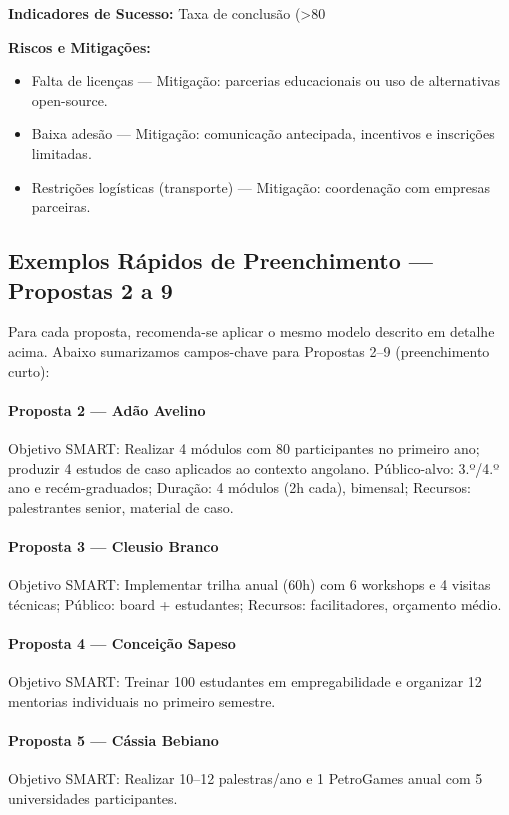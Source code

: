 \documentclass[12pt,a4paper]{article}
\begin{document}
\textbf{Indicadores de Sucesso:} Taxa de conclusão (>80%

\textbf{Riscos e Mitigações:}
\begin{itemize}
    \item Falta de licenças — Mitigação: parcerias educacionais ou uso de alternativas open-source.
    \item Baixa adesão — Mitigação: comunicação antecipada, incentivos e inscrições limitadas.
    \item Restrições logísticas (transporte) — Mitigação: coordenação com empresas parceiras.
\end{itemize}

\vspace{0.5cm}
\subsection*{Exemplos Rápidos de Preenchimento — Propostas 2 a 9}
\noindent Para cada proposta, recomenda-se aplicar o mesmo modelo descrito em detalhe acima. Abaixo sumarizamos campos-chave para Propostas 2–9 (preenchimento curto):

\paragraph{Proposta 2 — Adão Avelino}
Objetivo SMART: Realizar 4 módulos com 80 participantes no primeiro ano; produzir 4 estudos de caso aplicados ao contexto angolano.
Público-alvo: 3.º/4.º ano e recém-graduados; Duração: 4 módulos (2h cada), bimensal; Recursos: palestrantes senior, material de caso.

\paragraph{Proposta 3 — Cleusio Branco}
Objetivo SMART: Implementar trilha anual (60h) com 6 workshops e 4 visitas técnicas; Público: board + estudantes; Recursos: facilitadores, orçamento médio.

\paragraph{Proposta 4 — Conceição Sapeso}
Objetivo SMART: Treinar 100 estudantes em empregabilidade e organizar 12 mentorias individuais no primeiro semestre.

\paragraph{Proposta 5 — Cássia Bebiano}
Objetivo SMART: Realizar 10–12 palestras/ano e 1 PetroGames anual com 5 universidades participantes.
\end{document}
